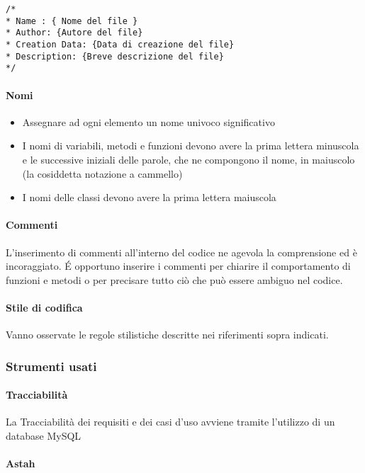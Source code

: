 \begin{verbatim}
/*
* Name : { Nome del file }
* Author: {Autore del file}
* Creation Data: {Data di creazione del file}
* Description: {Breve descrizione del file}
*/
\end{verbatim}

\paragraph{Nomi}
\begin{itemize}
\item Assegnare ad ogni elemento un nome univoco significativo
\item I nomi di variabili, metodi e funzioni devono avere la prima lettera minuscola e  le successive iniziali delle parole, che ne compongono il nome, in maiuscolo (la cosiddetta notazione a cammello)
\item I nomi delle classi devono avere la prima lettera maiuscola
\end{itemize}

\paragraph{Commenti}

L'inserimento di commenti all'interno del codice ne agevola la
comprensione ed è incoraggiato. \'E opportuno inserire i commenti per chiarire il
comportamento di funzioni e metodi o per precisare tutto ciò che può essere ambiguo
nel codice.

\paragraph{Stile di codifica}
Vanno osservate le regole stilistiche descritte nei riferimenti sopra indicati.

\subsubsection{Strumenti usati}

\paragraph{Tracciabilità}

La Tracciabilità dei requisiti e dei casi d'uso avviene tramite l'utilizzo di un database MySQL

\paragraph{Astah}


